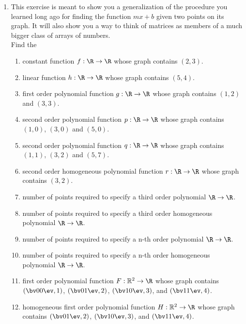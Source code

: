 \begin{enumerate}
\item This exercise is meant to show you a generalization of the procedure you learned long ago for finding the function $mx+b$  given two points on its graph. It will also show you a way to think of matrices as members of a much bigger class of arrays of numbers. \\

Find the
\begin{enumerate}
\item constant function $f:\R \to \R $ whose graph contains $(2,3)$.
\item linear function $h:\R \to \R$ whose graph contains $(5,4)$.
\item first order polynomial function $g:\R \to \R$ whose graph contains 
$(1,2)$ and $(3,3)$.
\item second order polynomial function $p:\R \to \R$ whose graph contains $(1,0)$, $(3,0)$ and $(5,0)$.
\item second order polynomial function $q:\R \to \R$ whose graph contains $(1,1)$, $(3,2)$ and $(5,7)$.
\item second order homogeneous polynomial function $r:\R \to \R$ whose graph contains $(3,2)$.\\
\item \label{3rdPoly} number of points required to specify a third order polynomial $\R\to \R$.
\item number of points required to specify a third order homogeneous polynomial $\R\to \R$.
\item number of points required to specify a n-th order polynomial $\R\to \R$.
\item number of points required to specify a n-th order homogeneous polynomial $\R\to \R$.\\
\item first order polynomial function $F:\mathbb{R}^2 \to \R $ whose graph contains 
$\left(  \bv 0\\0 \ev , 1\right)$, 
$\left(  \bv 0\\1 \ev , 2\right)$, 
$\left(  \bv 1\\0 \ev , 3\right)$,  and
$\left(  \bv 1\\1 \ev , 4\right)$.

\item homogeneous first order polynomial function $H:\mathbb{R}^2 \to \R $ whose graph contains 
$\left(  \bv 0\\1 \ev , 2\right)$, 
$\left(  \bv 1\\0 \ev , 3\right)$,  and
$\left(  \bv 1\\1 \ev , 4\right)$.


\end{enumerate}
\end{enumerate}
